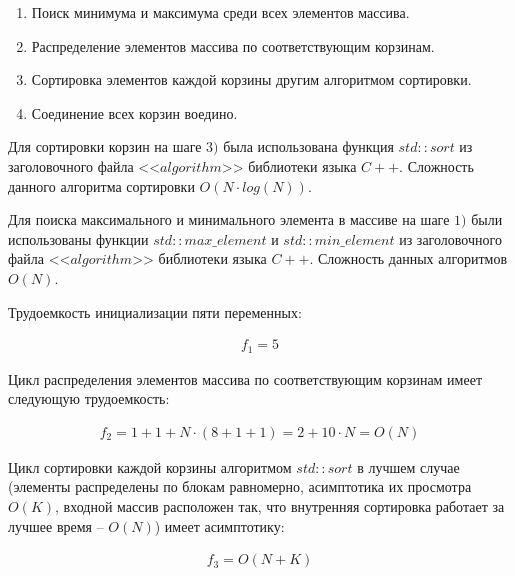 \begin{enumerate}[label={\arabic*)}]
	\item Поиск минимума и максимума среди всех элементов массива.
	\item Распределение элементов массива по соответствующим корзинам.
	\item Сортировка элементов каждой корзины другим алгоритмом сортировки.
	\item Соединение всех корзин воедино.
\end{enumerate}

Для сортировки корзин на шаге $3)$ была использована функция $std::sort$ из заголовочного файла <<$algorithm$>> библиотеки языка $C++$. Сложность данного алгоритма сортировки $O(N \cdot log(N))$.

Для поиска максимального и минимального элемента в массиве на шаге $1)$ были использованы функции $std::max\_element$ и $std::min\_element$ из заголовочного файла <<$algorithm$>> библиотеки языка $C++$. Сложность данных алгоритмов $O(N)$.

Трудоемкость инициализации пяти переменных:

\begin{equation}
	\label{eq:bucketPart1}
	\begin{gathered}
		f_1 = 5
	\end{gathered}
\end{equation}

Цикл распределения элементов массива по соответствующим корзинам имеет следующую трудоемкость:

\begin{equation}
	\label{eq:bucketPart2}
	\begin{gathered}
		f_2 = 1 + 1 + N \cdot (8 + 1 + 1) = 2 + 10 \cdot N = O(N)
	\end{gathered}
\end{equation}

Цикл сортировки каждой корзины алгоритмом $std::sort$ в лучшем случае (элементы распределены по блокам равномерно, асимптотика их просмотра $O(K)$, входной массив расположен так, что внутренняя сортировка работает за лучшее время -- $O(N)$) имеет асимптотику:

\begin{equation}
	\label{eq:bucketPart3}
	\begin{gathered}
		f_3 = O(N + K)
	\end{gathered}
\end{equation}

